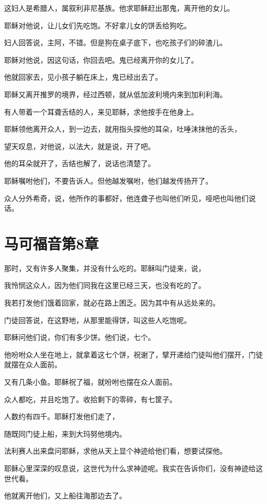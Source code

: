 \documentclass[12pt,oneside]{book}
\begin{document}
这妇人是希腊人，属叙利非尼基族。他求耶稣赶出那鬼，离开他的女儿。

耶稣对他说，让儿女们先吃饱。不好拿儿女的饼丢给狗吃。

妇人回答说，主阿，不错。但是狗在桌子底下，也吃孩子们的碎渣儿。

耶稣对他说，因这句话，你回去吧。鬼已经离开你的女儿了。

他就回家去，见小孩子躺在床上，鬼已经出去了。

耶稣又离开推罗的境界，经过西顿，就从低加波利境内来到加利利海。

有人带着一个耳聋舌结的人，来见耶稣，求他按手在他身上。

耶稣领他离开众人，到一边去，就用指头探他的耳朵，吐唾沫抹他的舌头，

望天叹息，对他说，以法大，就是说，开了吧。

他的耳朵就开了，舌结也解了，说话也清楚了。

耶稣嘱咐他们，不要告诉人。但他越发嘱咐，他们越发传扬开了。

众人分外希奇，说，他所作的事都好，他连聋子也叫他们听见，哑吧也叫他们说话。

\chapter{马可福音第8章}
那时，又有许多人聚集，并没有什么吃的。耶稣叫门徒来，说，

我怜悯这众人，因为他们同我在这里已经三天，也没有吃的了。

我若打发他们饿着回家，就必在路上困乏。因为其中有从远处来的。

门徒回答说，在这野地，从那里能得饼，叫这些人吃饱呢。

耶稣问他们说，你们有多少饼。他们说，七个。

他吩咐众人坐在地上，就拿着这七个饼，祝谢了，擘开递给门徒叫他们摆开，门徒就摆在众人面前。

又有几条小鱼。耶稣祝了福，就吩咐也摆在众人面前。

众人都吃，并且吃饱了。收拾剩下的零碎，有七筐子。

人数约有四千。耶稣打发他们走了，

随既同门徒上船，来到大玛努他境内。

法利赛人出来盘问耶稣，求他从天上显个神迹给他们看，想要试探他。

耶稣心里深深的叹息说，这世代为什么求神迹呢。我实在告诉你们，没有神迹给这世代看。

他就离开他们，又上船往海那边去了。
\end{document}
